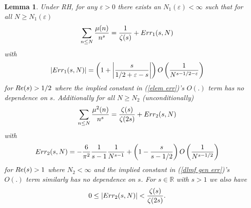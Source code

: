 \documentclass[11pt,article]{amsart}
\numberwithin{equation}{section}
\newtheorem{lemma}{Lemma}
\numberwithin{equation}{section}
\numberwithin{lemma}{section}
\numberwithin{prop}{section}
\begin{document}
\begin{lemma}
Under RH, for any $\varepsilon>0$ there exists an $N_{1}(\varepsilon)<\infty$ such that for all $N\geq N_{1}(\varepsilon)$ 
\begin{align}
\sum_{n\leq N}\frac{\mu(n)}{n^{s}}=\frac{1}{\zeta(s)}+\textnormal{Err}_{1}(s,N) \label{elem finite}
\end{align}
with 
\begin{align}
\left|\textnormal{Err}_{1}(s,N)\right|=\left(1+\left|\frac{s}{1/2+\varepsilon-s}\right|\right)O\left(\frac{1}{N^{s-1/2-\varepsilon}}\right) \label{elem err}
\end{align}
for $\textnormal{Re}(s)>1/2$ where the implied constant in (\ref{elem err})'s $O(.)$ term has no dependence on $s$. Additionally for all $N\geq N_{2}$ (unconditionally)
\begin{align}
\sum_{n\leq N}\frac{\mu^{2}(n)}{n^{s}}=\frac{\zeta(s)}{\zeta(2s)}+\textnormal{Err}_{2}(s,N) \label{dlmf gen finite}
\end{align}
with
\begin{align}
\textnormal{Err}_{2}(s,N)=-\frac{6}{\pi^{2}}\frac{1}{s-1}\frac{1}{N^{s-1}}+\left(1-\frac{s}{s-1/2}\right)O\left(\frac{1}{N^{s-1/2}}\right) \label{dlmf gen err}
\end{align}
for $\textnormal{Re}(s)>1$ where $N_{2}<\infty$ and the implied constant in (\ref{dlmf gen err})'s $O(.)$ term similarly has no dependence on $s$. For $s\in \mathbb{R}$ with $s>1$ we also have 
\begin{equation}
0\leq \left|\textnormal{Err}_{2}(s,N)\right|<\frac{\zeta(s)}{\zeta(2s)}. \label{dlmf gen err 2}
\end{equation} \label{elem lemma}
\end{lemma}
\end{document}
